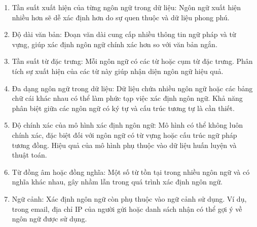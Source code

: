 \begin{enumerate}

    \item Tần suất xuất hiện của từng ngôn ngữ trong dữ liệu: Ngôn ngữ xuất hiện nhiều hơn sẽ dễ xác định hơn do sự quen thuộc và dữ liệu phong phú.
    \item Độ dài văn bản: Đoạn văn dài cung cấp nhiều thông tin ngữ pháp và từ vựng, giúp xác định ngôn ngữ chính xác hơn so với văn bản ngắn.
    \item Tần suất từ đặc trưng: Mỗi ngôn ngữ có các từ hoặc cụm từ đặc trưng. Phân tích sự xuất hiện của các từ này giúp nhận diện ngôn ngữ hiệu quả.
    \item Đa dạng ngôn ngữ trong dữ liệu: Dữ liệu chứa nhiều ngôn ngữ hoặc các bảng chữ cái khác nhau có thể làm phức tạp việc xác định ngôn ngữ. Khả năng phân biệt giữa các ngôn ngữ có ký tự và cấu trúc tương tự là cần thiết.
    \item Độ chính xác của mô hình xác định ngôn ngữ: Mô hình có thể không luôn chính xác, đặc biệt đối với ngôn ngữ có từ vựng hoặc cấu trúc ngữ pháp tương đồng. Hiệu quả của mô hình phụ thuộc vào dữ liệu huấn luyện và thuật toán.
    \item Từ đồng âm hoặc đồng nghĩa: Một số từ tồn tại trong nhiều ngôn ngữ và có nghĩa khác nhau, gây nhầm lẫn trong quá trình xác định ngôn ngữ.
    \item Ngữ cảnh: Xác định ngôn ngữ còn phụ thuộc vào ngữ cảnh sử dụng. Ví dụ, trong email, địa chỉ IP của người gửi hoặc danh sách nhận có thể gợi ý về ngôn ngữ được sử dụng.

\end{enumerate}

